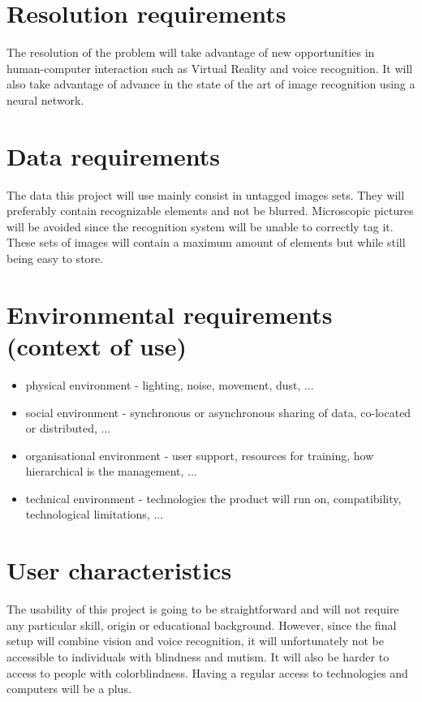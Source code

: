 \documentclass[11pt,a4paper]{article}
\begin{document}
\section{Resolution requirements}

The resolution of the problem will take advantage of new opportunities in human-computer interaction such as Virtual Reality and voice recognition. It will also take advantage of advance in the state of the art of image recognition using a neural network.

\section{Data requirements\todo{}}

The data this project will use mainly consist in untagged images sets. They will preferably contain recognizable elements and not be blurred. Microscopic pictures will be avoided since the recognition system will be unable to correctly tag it. These sets of images will contain a maximum amount of elements but while still being easy to store. 


\section{Environmental requirements (context of use)\todo{}}

\begin{itemize}
\item physical environment
- lighting, noise, movement, dust, ...
\item social environment
- synchronous or asynchronous sharing of data, co-located or distributed, ...
\item organisational environment
- user support, resources for training, how hierarchical is the management, ...
\item technical environment
- technologies the product will run on, compatibility, technological limitations, ...
\end{itemize}

\section{User characteristics\todo{}}

The usability of this project is going to be straightforward and will not require any particular skill, origin or educational background. However, since the final setup will combine vision and voice recognition, it will unfortunately not be accessible to individuals with blindness and mutism. It will also be harder to access to people with colorblindness. Having a regular access to technologies and computers will be a plus.
\end{document}
